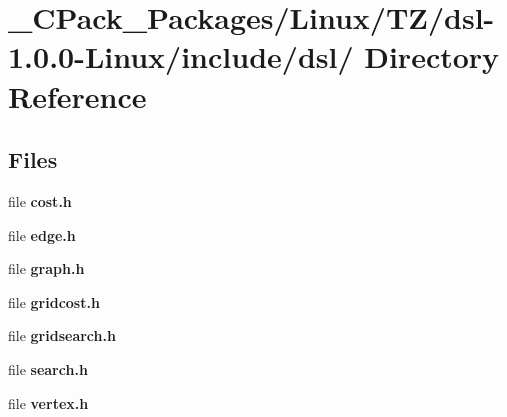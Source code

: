 \section{\_\-CPack\_\-Packages/Linux/TZ/dsl-\/1.0.0-\/Linux/include/dsl/ Directory Reference}
\label{dir_e42cc2da18249826ce68985d33c256f4}
\subsection*{Files}
\begin{DoxyCompactItemize}
\item 
file {\bf cost.h}
\item 
file {\bf edge.h}
\item 
file {\bf graph.h}
\item 
file {\bf gridcost.h}
\item 
file {\bf gridsearch.h}
\item 
file {\bf search.h}
\item 
file {\bf vertex.h}
\end{DoxyCompactItemize}
